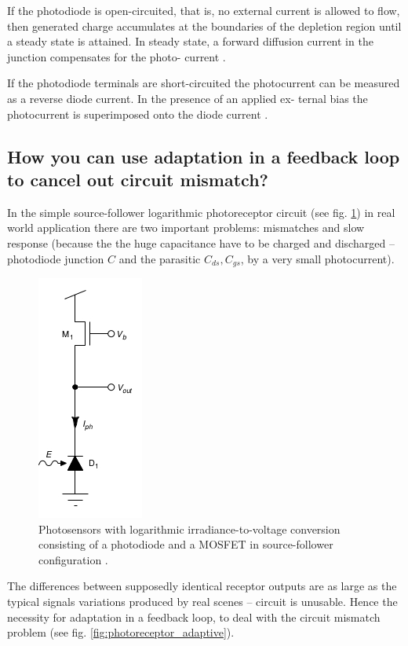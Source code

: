 \documentclass[main]{subfiles}
\begin{document}
If the photodiode is open-circuited, that is, no external current is allowed
to flow, then generated charge accumulates at the boundaries of the depletion
region until a steady state is attained. In steady state, a forward diffusion current in
the junction compensates for the photo-
current \cite{paper:photo}.

If the photodiode terminals are short-circuited the photocurrent
can be measured as a reverse diode current. In the presence of an applied ex-
ternal bias the photocurrent is superimposed onto the diode current \cite{book:VLSI}.



\subsection{How you can use adaptation in a feedback loop to cancel out circuit mismatch?}

In the simple source-follower logarithmic photoreceptor circuit (see fig. \ref{fig:photoreceptor_log}) in real world application there are two important problems: mismatches and slow response (because the the huge capacitance have to be charged and discharged -- photodiode junction $C$ and the parasitic $C_{ds}, C_{gs}$, by a very small photocurrent). 

\begin{figure}[htbp]
  \centering
  \includegraphics[scale=0.8]{pics/photoreceptor_log.jpg}
  \caption{Photosensors with logarithmic irradiance-to-voltage conversion consisting of a photodiode and a MOSFET in source-follower configuration \cite{book:VLSI}.}
  \label{fig:photoreceptor_log}
\end{figure} 

The differences between supposedly identical receptor outputs are as large as the typical signals
variations produced by real scenes -- circuit is unusable. Hence the necessity for adaptation in a feedback loop, to deal with the circuit mismatch problem (see fig. \ref{fig:photoreceptor_adaptive}).
\end{document}
